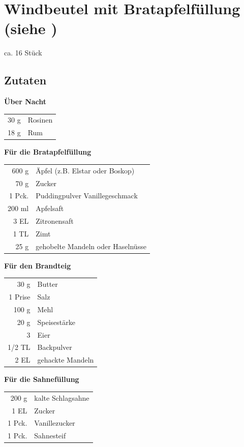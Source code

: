 \section[Windbeutel mit Bratapfelfüllung]{Windbeutel mit Bratapfelfüllung \textmd{(siehe \cite{LandideeWindbeutelBratapfel})}} 
ca. 16 Stück
\subsection*{Zutaten}


\textbf{Über Nacht} \\
\begin{tabular}{r l}
    30 g &Rosinen\\
    18 g &Rum\\
\end{tabular}

\textbf{Für die Bratapfelfüllung} \\
\begin{tabular}{r l}
     600 g & Äpfel (z.B. Elstar oder Boskop)   \\
      70 g & Zucker                            \\
    1 Pck. & Puddingpulver Vanillegeschmack   \\
    200 ml & Apfelsaft                         \\
      3 EL & Zitronensaft                      \\
      1 TL & Zimt                              \\
      25 g & gehobelte Mandeln oder Haselnüsse
\end{tabular}

\textbf{Für den Brandteig}\\
\begin{tabular}{r l}
       30 g & Butter           \\
    1 Prise & Salz             \\
      100 g & Mehl             \\
       20 g & Speisestärke     \\
          3 & Eier             \\
     1/2 TL & Backpulver       \\
       2 EL & gehackte Mandeln
\end{tabular}

\textbf{Für die Sahnefüllung} \\
\begin{tabular}{r l}
     200 g & kalte Schlagsahne \\
      1 EL & Zucker            \\
    1 Pck. & Vanillezucker     \\
    1 Pck. & Sahnesteif
\end{tabular}
